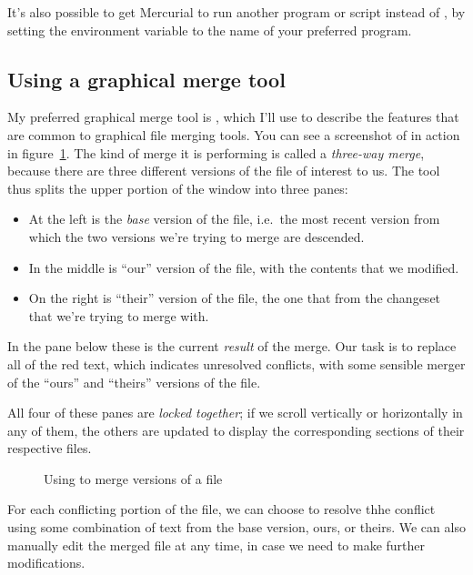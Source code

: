 It's also possible to get Mercurial to run another program or script
instead of , by setting the 
environment variable to the name of your preferred program.

\subsection{Using a graphical merge tool}

My preferred graphical merge tool is , which I'll use
to describe the features that are common to graphical file merging
tools.  You can see a screenshot of  in action in
figure~\ref{fig:tour-merge:kdiff3}.  The kind of merge it is
performing is called a \emph{three-way merge}, because there are three
different versions of the file of interest to us.  The tool thus
splits the upper portion of the window into three panes:
\begin{itemize}
\item At the left is the \emph{base} version of the file, i.e.~the
  most recent version from which the two versions we're trying to
  merge are descended.
\item In the middle is ``our'' version of the file, with the contents
  that we modified.
\item On the right is ``their'' version of the file, the one that
  from the changeset that we're trying to merge with.
\end{itemize}
In the pane below these is the current \emph{result} of the merge.
Our task is to replace all of the red text, which indicates unresolved
conflicts, with some sensible merger of the ``ours'' and ``theirs''
versions of the file.

All four of these panes are \emph{locked together}; if we scroll
vertically or horizontally in any of them, the others are updated to
display the corresponding sections of their respective files.

\begin{figure}[ht]
  \centering
  \caption{Using  to merge versions of a file}
  \label{fig:tour-merge:kdiff3}
\end{figure}

For each conflicting portion of the file, we can choose to resolve
thhe conflict using some combination of text from the base version,
ours, or theirs.  We can also manually edit the merged file at any
time, in case we need to make further modifications.

